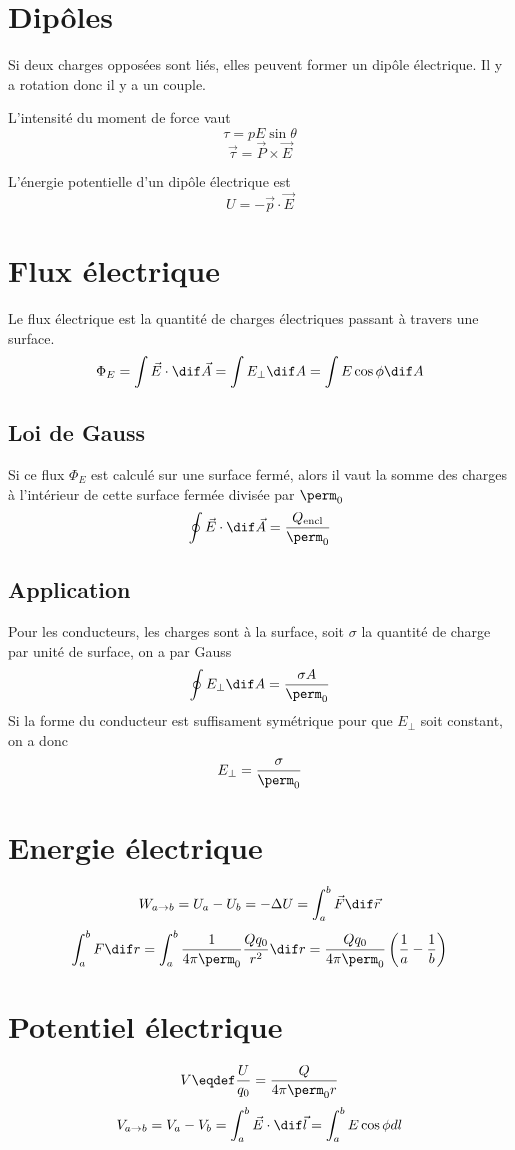 \section{Dipôles}
Si deux charges opposées sont liés, elles peuvent former un dipôle électrique.
Il y a rotation donc il y a un couple.

L'intensité du moment de force vaut
\[ \tau = pE\sin{\theta} \]
\[ \vec{\tau} = \vec{P} \times \vec{E} \]

L'énergie potentielle d'un dipôle électrique est
\[ U = -\vec{p} \cdot \vec{E} \]

\section{Flux électrique}
Le flux électrique est la quantité de charges
électriques passant à travers une surface.
\[ \Phi_E = \int \vec{E} \cdot \dif\vec{A} =
\int E_{\perp} \dif A = \int E\cos\phi \dif A \]

\subsection{Loi de Gauss}
Si ce flux $\Phi_E$ est calculé sur une surface fermé,
alors il vaut la somme des charges à l'intérieur
de cette surface fermée divisée par $\perm_0$
\[ \oint \vec{E} \cdot \dif\vec{A} = \frac{Q_\mathrm{encl}}{\perm_0} \]

\subsection{Application}
Pour les conducteurs, les charges sont à la surface,
soit $\sigma$ la quantité de charge par unité de surface, on a par Gauss
\[ \oint E_\perp \dif A = \frac{\sigma A}{\perm_0} \]
Si la forme du conducteur est suffisament symétrique
pour que $E_\perp$ soit constant, on a donc
\[ E_{\perp} = \frac{\sigma}{\perm_0} \]

\section{Energie électrique}
\[ W_{a\rightarrow b} = U_a - U_b = -\Delta{U}
= \int_{a}^{b}\vec{F} \dif \vec{r} \]
\[ \int_{a}^{b}F \dif r
= \int_{a}^{b}\frac{1}{4\pi\perm_0}\frac{Qq_0}{r^2} \dif r
= \frac{Qq_0}{4\pi\perm_0}\left(\frac{1}{a} - \frac{1}{b}\right) \]

\section{Potentiel électrique}
\[ V \eqdef \frac{U}{q_0} = \frac{Q}{4\pi\perm_0{r}} \]
\[ V_{a \rightarrow b} = V_a - V_b = \int_{a}^{b}\vec{E}\cdot\dif\vec{l}
= \int_{a}^{b}E\cos{\phi} dl \]

